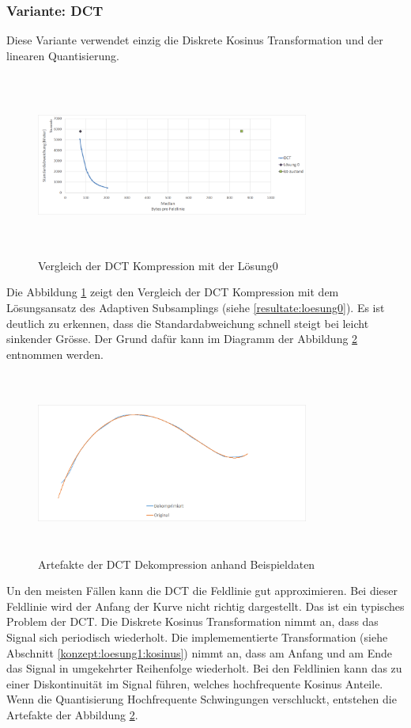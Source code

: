 \subsubsection{Variante: DCT}\label{resultate:dct}
Diese Variante verwendet einzig die Diskrete Kosinus Transformation und der linearen Quantisierung.
\begin{figure}[!htbp]
	\center
	\includegraphics[width=0.8\textwidth,height=6cm,keepaspectratio]{./pictures/resultate/loesung1/loesung1-0/loesung1_0.png}
	\caption{Vergleich der DCT Kompression mit der Lösung0}
	\label{resultate:loesung1:dct:resultate}
\end{figure}
Die Abbildung \ref{resultate:loesung1:dct:resultate} zeigt den Vergleich der DCT Kompression mit dem Lösungsansatz des Adaptiven Subsamplings (siehe \ref{resultate:loesung0}). Es ist deutlich zu erkennen, dass die Standardabweichung schnell steigt bei leicht sinkender Grösse. Der Grund dafür kann im Diagramm der Abbildung \ref{resultate:loesung1:dct:artefakte} entnommen werden. 
\begin{figure}[!htbp]
	\center
	\includegraphics[width=0.8\textwidth,height=6cm,keepaspectratio]{./pictures/resultate/loesung1/loesung1-0/loesung1_0_artefakte.png}
	\caption{Artefakte der DCT Dekompression anhand Beispieldaten}
	\label{resultate:loesung1:dct:artefakte}
\end{figure}
Un den meisten Fällen kann die DCT die Feldlinie gut approximieren. Bei dieser Feldlinie wird der Anfang der Kurve nicht richtig dargestellt. Das ist ein typisches Problem der DCT. Die Diskrete Kosinus Transformation nimmt an, dass das Signal sich periodisch wiederholt. Die implemementierte Transformation (siehe Abschnitt \ref{konzept:loesung1:kosinus}) nimmt an, dass am Anfang und am Ende das Signal in umgekehrter Reihenfolge wiederholt. Bei den Feldlinien kann das zu einer Diskontinuität im Signal führen, welches hochfrequente Kosinus Anteile. Wenn die Quantisierung Hochfrequente Schwingungen verschluckt, entstehen die Artefakte der Abbildung \ref{resultate:loesung1:dct:artefakte}.\\
